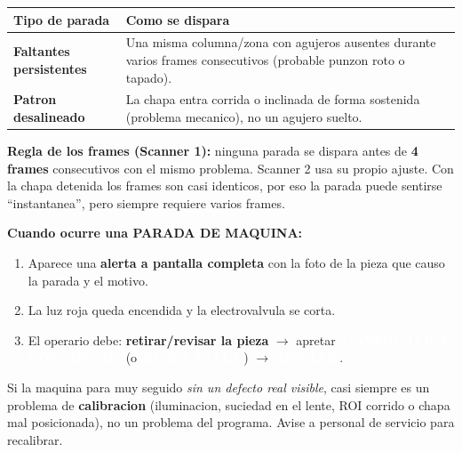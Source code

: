 \documentclass[11pt,a4paper]{article}
\newcommand{\btn}[1]{\colorbox{ink}{\textcolor{white}{\small\,\textbf{#1}\,}}}
\begin{document}
\begin{center}
\renewcommand{\arraystretch}{1.4}
\begin{tabular}{>{\raggedright\arraybackslash}p{5.2cm} >{\raggedright\arraybackslash}p{9.6cm}}
\toprule
\textbf{Tipo de parada} & \textbf{Como se dispara}\\
\midrule
\textbf{Faltantes persistentes} & Una misma columna/zona con agujeros
  ausentes durante varios frames consecutivos (probable punzon roto o tapado).\\
\textbf{Patron desalineado} & La chapa entra corrida o inclinada de forma
  sostenida (problema mecanico), no un agujero suelto.\\
\bottomrule
\end{tabular}
\end{center}

\begin{infobox}
\textbf{Regla de los frames (Scanner 1):} ninguna parada se dispara antes de
\textbf{4 frames} consecutivos con el mismo problema. Scanner 2 usa su propio
ajuste. Con la chapa detenida los frames son casi identicos, por eso la
parada puede sentirse ``instantanea'', pero siempre requiere varios frames.
\end{infobox}

\textbf{Cuando ocurre una PARADA DE MAQUINA:}
\begin{enumerate}[leftmargin=1.5em]
  \item Aparece una \textbf{alerta a pantalla completa} con la foto de la
        pieza que causo la parada y el motivo.
  \item La luz roja queda encendida y la electrovalvula se corta.
  \item El operario debe: \textbf{retirar/revisar la pieza} $\to$ apretar
        \btn{CONFIRMAR Y CONTINUAR} (o \btn{RESET FALLA}) $\to$ \btn{INICIAR}.
\end{enumerate}

\begin{warnbox}
Si la maquina para muy seguido \emph{sin un defecto real visible}, casi
siempre es un problema de \textbf{calibracion} (iluminacion, suciedad en el
lente, ROI corrido o chapa mal posicionada), no un problema del programa.
Avise a personal de servicio para recalibrar.
\end{warnbox}

\end{document}
